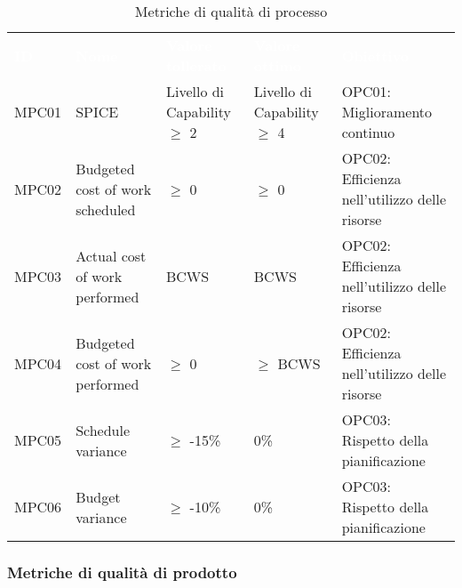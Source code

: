 \begin{table}[H]
    \renewcommand{\arraystretch}{1.5}
    \begin{tabular}{ m{}<{\centering}  m{}<{\centering}  m{}<{\centering}  m{}<{\centering} m{}<{\centering}}
        \rowcolor{darkblue}
        \textcolor{white}{\textbf{ID}} &\textcolor{white}{\textbf{Nome}}& \textcolor{white}{\textbf{Valore tollerato}} & \textcolor{white}{\textbf{Valore ottimo}} & \textcolor{white}{\textbf{Obiettivo}}\\ 
        
        MPC01 &
        SPICE &
        Livello di Capability $\geq$ 2 &
        Livello di Capability $\geq$ 4 &
        OPC01: Miglioramento continuo \\

        MPC02 &
        Budgeted cost of work scheduled &
        $\geq$ 0 &
        $\geq$ 0 &
        OPC02: Efficienza nell’utilizzo delle risorse \\

        MPC03 &
        Actual cost of work performed &
        BCWS &
        BCWS &
        OPC02: Efficienza nell’utilizzo delle risorse\\

        MPC04 &
        Budgeted cost of work performed &
        $\geq$ 0 &
        $\geq$ BCWS &
        OPC02: Efficienza nell’utilizzo delle risorse \\

        MPC05 &
        Schedule variance &
        $\geq$ -15\% &
        0\% &
        OPC03: Rispetto della pianificazione \\

        MPC06 &
        Budget variance &
        $\geq$ -10\% &
        0\% &
        OPC03: Rispetto della pianificazione \\


    \end{tabular}
    \caption{Metriche di qualità di processo}
\end{table}

\subsubsection{Metriche di qualità di prodotto}


